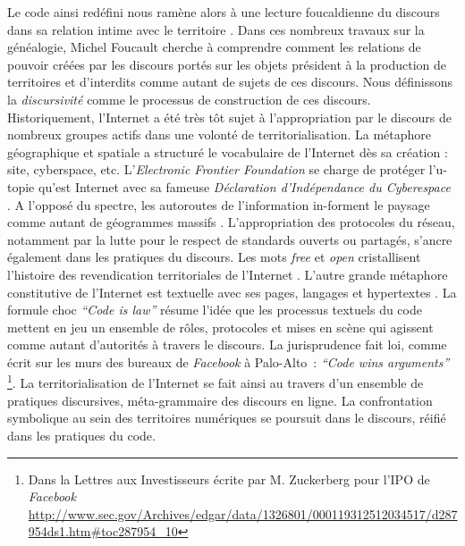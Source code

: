 Le code ainsi redéfini nous ramène alors à une lecture foucaldienne du discours dans sa relation intime avec le territoire \citep{Foucault2004}. Dans ces nombreux travaux sur la généalogie, Michel Foucault cherche à comprendre comment les relations de pouvoir créées par les discours portés sur les objets président à la production de territoires et d’interdits comme autant de sujets de ces discours. Nous définissons la \textit{discursivité} comme le processus de construction de ces discours. Historiquement, l’Internet a été très tôt sujet à l’appropriation par le discours de nombreux groupes actifs dans une volonté de territorialisation. La métaphore géographique et spatiale a structuré le vocabulaire de l’Internet dès sa création \citep{Graham1998}: site, cyberspace, etc. L’\textit{Electronic Frontier Foundation} se charge de protéger l’u-topie qu’est Internet avec sa fameuse \textit{Déclaration d’Indépendance du Cyberespace} \citep{Barlow2001}. A l’opposé du spectre, les autoroutes de l’information in-forment le paysage comme autant de géogrammes massifs \citep{Berque1999}. L’appropriation des protocoles du réseau, notamment par la lutte pour le respect de standards ouverts ou partagés, s’ancre également dans les pratiques du discours. Les mots \textit{free} et \textit{open} cristallisent l’histoire des revendication territoriales de l’Internet \citep{Blondeau2000}. L’autre grande métaphore constitutive de l’Internet est textuelle avec ses pages, langages et hypertextes \citep{Vandendorpe1999}. La formule choc \textit{``Code is law''} \citep{Lessig2006} résume l’idée  que les processus textuels du code mettent en jeu un ensemble de rôles, protocoles et mises en scène qui agissent comme autant d’autorités à travers le discours. La jurisprudence fait loi, comme écrit sur les murs des bureaux de \textit{Facebook} à Palo-Alto : \textit{``Code wins arguments''} \footnote{Dans la Lettres aux Investisseurs écrite par M. Zuckerberg  pour l’IPO de \textit{Facebook} \url{http://www.sec.gov/Archives/edgar/data/1326801/000119312512034517/d287954ds1.htm\#toc287954_10}}. La territorialisation de l’Internet se fait ainsi au travers d’un ensemble de pratiques discursives, méta-grammaire des discours en ligne. La confrontation symbolique au sein des territoires numériques se poursuit dans le discours, réifié dans les pratiques du code.


